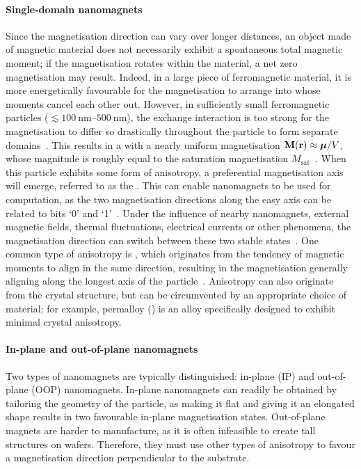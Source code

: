 \paragraph{Single-domain nanomagnets}
Since the magnetisation direction can vary over longer distances, an object made of magnetic material does not necessarily exhibit a spontaneous total magnetic moment; if the magnetisation rotates within the material, a net zero magnetisation may result.
Indeed, in a large piece of ferromagnetic material, it is more energetically favourable for the magnetisation to arrange into  whose moments cancel each other out. %
However, in sufficiently small ferromagnetic particles ($\lesssim \SIrange{100}{500}{\nano\metre}$), the exchange interaction is too strong for the magnetisation to differ so drastically throughout the particle to form separate domains~\cite{Kittel_TheoryFMDomains}.
This results in a  with a nearly uniform magnetisation $\boldsymbol{\mathbf{M}}(\boldsymbol{\mathbf{r}}) \approx \boldsymbol{\mathbf{\mu}}/V$, whose magnitude is roughly equal to the saturation magnetisation $M_\mathrm{sat}$~\cite{FRENKEL1930}. %
When this particle exhibits some form of anisotropy, a preferential magnetisation axis will emerge, referred to as the .
This can enable nanomagnets to be used for computation, as the two magnetisation directions along the easy axis can be related to bits `0' and `1'~\cite{MQCA_RoomTemp,NML_Carlton,JM_Masterproef}.
Under the influence of nearby nanomagnets, external magnetic fields, thermal fluctuations, electrical currents or other phenomena, the magnetisation direction can switch between these two stable states~\cite{SwitchingForced_EnergyEfficient,BrownThermalFluctuations,neel1949theorie}.
One common type of anisotropy is , which originates from the tendency of magnetic moments to align in the same direction, resulting in the magnetisation generally aligning along the longest axis of the particle~\cite{MagneticCharge}.
Anisotropy can also originate from the crystal structure, but can be circumvented by an appropriate choice of material; for example, permalloy () is an alloy specifically designed to exhibit minimal crystal anisotropy.

\paragraph{In-plane and out-of-plane nanomagnets}
Two types of nanomagnets are typically distinguished: in-plane (IP) and out-of-plane (OOP) nanomagnets.
In-plane nanomagnets can readily be obtained by tailoring the geometry of the particle, as making it flat and giving it an elongated shape results in two favourable in-plane magnetisation states.
Out-of-plane magnets are harder to manufacture, as it is often infeasible to create tall structures on wafers.
Therefore, they must use other types of anisotropy to favour a magnetisation direction perpendicular to the substrate.

